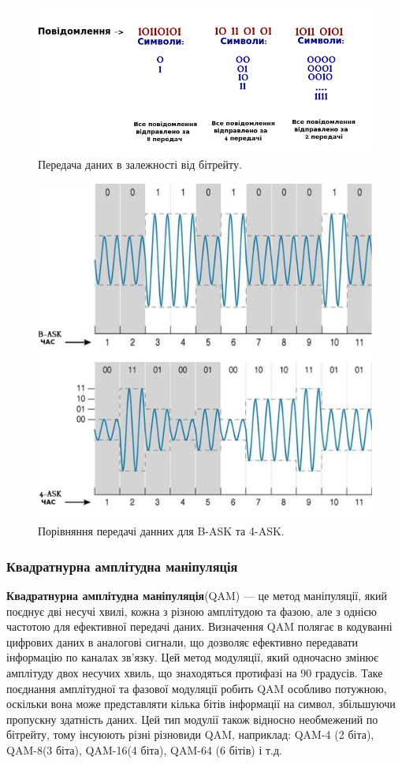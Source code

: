 \documentclass{article}
\begin{document}
\begin{figure}[h!]
	\centering
	\includegraphics[width=0.8\linewidth]{images/transmittion_speed.png}
	\caption{\label{fig:transmittion_speed} Передача даних в залежності від бітрейту.}
\end{figure}

\begin{figure}[h!]
	\centering
	\includegraphics[width=0.8\linewidth]{images/comparison-bask-vs-4ask.png}
	\caption{\label{fig:comparison-bask-vs-4ask} Порівняння передачі данних для B-ASK та 4-ASK.}
\end{figure}


\newpage
\subsubsection{Квадратнурна амплітудна маніпуляція}
\textbf{Квадратнурна амплітудна маніпуляція}(QAM) --- це метод маніпуляції, який поєднує дві несучі хвилі, кожна з різною амплітудою та фазою, але з однією частотою для ефективної передачі даних. Визначення QAM полягає в кодуванні цифрових даних в аналогові сигнали, що дозволяє ефективно передавати інформацію по каналах зв'язку. Цей метод модуляції, який одночасно змінює амплітуду двох несучих хвиль, що знаходяться протифазі на 90 градусів. Таке поєднання амплітудної та фазової модуляції робить QAM особливо потужною, оскільки вона може представляти кілька бітів інформації на символ, збільшуючи пропускну здатність даних. Цей тип модулії також відносно необмежений по бітрейту, тому інсуюють різні різновиди QAM, наприклад: QAM-4 (2 біта), QAM-8(3 біта), QAM-16(4 біта), QAM-64 (6 бітів) і т.д.
\end{document}
